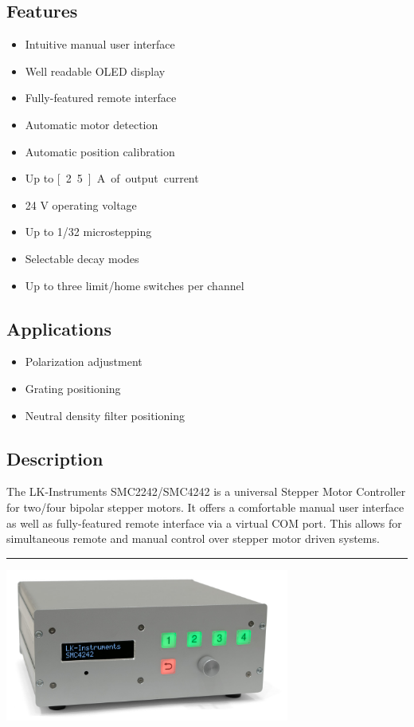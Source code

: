 \documentclass[a4paper, final, 12pt, oneside]{scrartcl}
\numberwithin{equation}{section}
\numberwithin{table}{section}
\numberwithin{figure}{section}
\begin{document}
\begin{multicols}{2}
\subsection*{Features}
\begin{itemize}
  \item Intuitive manual user interface
  \item Well readable OLED display
  \item Fully-featured remote interface
  \item Automatic motor detection
  \item Automatic position calibration
  \item Up to \unit[2.5]{A} of output current
  \item 24 V operating voltage
  \item Up to 1/32 microstepping
  \item Selectable decay modes
  \item Up to three limit/home switches per channel
\end{itemize}
\FloatBarrier

\subsection*{Applications}
\begin{itemize}
  \item[] Polarization adjustment
  \item[] Grating positioning
  \item[] Neutral density filter positioning
\end{itemize}
\FloatBarrier

\subsection*{Description}
The LK-Instruments SMC2242/SMC4242 is a universal Stepper Motor Controller for two/four bipolar stepper motors. It offers a  comfortable manual user interface as well as fully-featured remote interface via a virtual COM port. This allows for simultaneous remote and manual control over stepper motor driven systems.
\end{multicols}
\noindent\rule{\textwidth}{0.4pt}
\vspace*{0.5cm}

\centerline{\includegraphics[width=0.7\textwidth]{./drawings/SMC_1400.jpg}}
\end{document}
